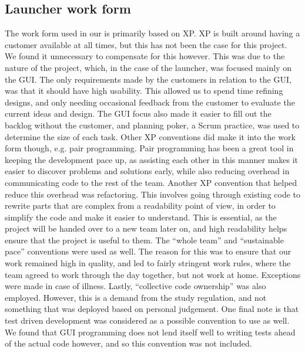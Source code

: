 \subsection{Launcher work form}
The work form used in our \localgroup{} is primarily based on XP. 
XP is built around having a customer available at all times, but this has not been the case for this project. 
We found it unnecessary to compensate for this however. 
This was due to the nature of the project, which, in the case of the launcher, was focused mainly on the GUI. 
The only requirements made by the customers in relation to the GUI, was that it should have high usability. 
This allowed us to spend time refining designs, and only needing occasional feedback from the customer to evaluate the current ideas and design. 
The GUI focus also made it easier to fill out the backlog without the customer, and planning poker, a Scrum practice, was used to determine the size of each task. \newline
Other XP conventions did make it into the work form though, e.g. pair programming. 
Pair programming has been a great tool in keeping the development pace up, as assisting each other in this manner makes it easier to discover problems and solutions early, while also reducing overhead in communicating code to the rest of the team. \newline
Another XP convention that helped reduce this overhead was refactoring. 
This involves going through existing code to rewrite parts that are complex from a readability point of view, in order to simplify the code and make it easier to understand. 
This is essential, as the project will be handed over to a new team later on, and high readability helps ensure that the project is useful to them. \newline
The \textquotedblleft{}whole team\textquotedblright{} and \textquotedblleft{}sustainable pace\textquotedblright{} conventions were used as well. 
The reason for this was to ensure that our work remained high in quality, and led to fairly stringent work rules, where the team agreed to work through the day together, but not work at home. 
Exceptions were made in case of illness. 
Lastly, \textquotedblleft{}collective code ownership\textquotedblright{} was also employed. 
However, this is a demand from the study regulation, and not something that was deployed based on personal judgement. \newline
One final note is that test driven development was considered as a possible convention to use as well. 
We found that GUI programming does not lend itself well to writing tests ahead of the actual code however, and so this convention was not included. 